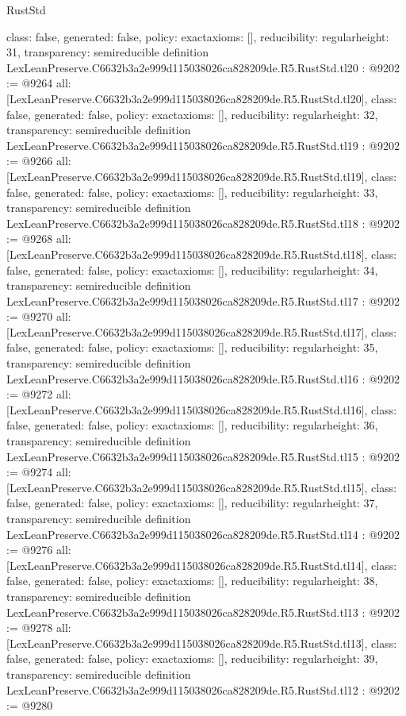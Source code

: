 \begin{lexlean}{RustStd}
\begin{coremodule}
{  class: false,
  generated: false,
  policy: exact{axioms: []},
  reducibility: regular{height: 31},
  transparency: semireducible
}
definition LexLeanPreserve.C6632b3a2e999d115038026ca828209de.R5.RustStd.tl20 : @9202 := @9264 {
  all: [LexLeanPreserve.C6632b3a2e999d115038026ca828209de.R5.RustStd.tl20],
  class: false,
  generated: false,
  policy: exact{axioms: []},
  reducibility: regular{height: 32},
  transparency: semireducible
}
definition LexLeanPreserve.C6632b3a2e999d115038026ca828209de.R5.RustStd.tl19 : @9202 := @9266 {
  all: [LexLeanPreserve.C6632b3a2e999d115038026ca828209de.R5.RustStd.tl19],
  class: false,
  generated: false,
  policy: exact{axioms: []},
  reducibility: regular{height: 33},
  transparency: semireducible
}
definition LexLeanPreserve.C6632b3a2e999d115038026ca828209de.R5.RustStd.tl18 : @9202 := @9268 {
  all: [LexLeanPreserve.C6632b3a2e999d115038026ca828209de.R5.RustStd.tl18],
  class: false,
  generated: false,
  policy: exact{axioms: []},
  reducibility: regular{height: 34},
  transparency: semireducible
}
definition LexLeanPreserve.C6632b3a2e999d115038026ca828209de.R5.RustStd.tl17 : @9202 := @9270 {
  all: [LexLeanPreserve.C6632b3a2e999d115038026ca828209de.R5.RustStd.tl17],
  class: false,
  generated: false,
  policy: exact{axioms: []},
  reducibility: regular{height: 35},
  transparency: semireducible
}
definition LexLeanPreserve.C6632b3a2e999d115038026ca828209de.R5.RustStd.tl16 : @9202 := @9272 {
  all: [LexLeanPreserve.C6632b3a2e999d115038026ca828209de.R5.RustStd.tl16],
  class: false,
  generated: false,
  policy: exact{axioms: []},
  reducibility: regular{height: 36},
  transparency: semireducible
}
definition LexLeanPreserve.C6632b3a2e999d115038026ca828209de.R5.RustStd.tl15 : @9202 := @9274 {
  all: [LexLeanPreserve.C6632b3a2e999d115038026ca828209de.R5.RustStd.tl15],
  class: false,
  generated: false,
  policy: exact{axioms: []},
  reducibility: regular{height: 37},
  transparency: semireducible
}
definition LexLeanPreserve.C6632b3a2e999d115038026ca828209de.R5.RustStd.tl14 : @9202 := @9276 {
  all: [LexLeanPreserve.C6632b3a2e999d115038026ca828209de.R5.RustStd.tl14],
  class: false,
  generated: false,
  policy: exact{axioms: []},
  reducibility: regular{height: 38},
  transparency: semireducible
}
definition LexLeanPreserve.C6632b3a2e999d115038026ca828209de.R5.RustStd.tl13 : @9202 := @9278 {
  all: [LexLeanPreserve.C6632b3a2e999d115038026ca828209de.R5.RustStd.tl13],
  class: false,
  generated: false,
  policy: exact{axioms: []},
  reducibility: regular{height: 39},
  transparency: semireducible
}
definition LexLeanPreserve.C6632b3a2e999d115038026ca828209de.R5.RustStd.tl12 : @9202 := @9280 {
}
\end{coremodule}
\end{lexlean}
